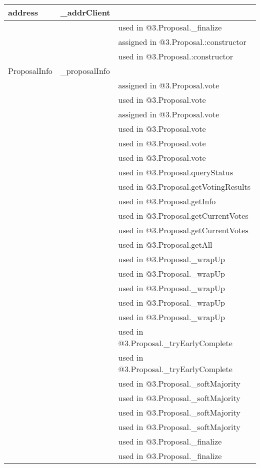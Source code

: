 \ifsoltables
\noindent\begin{tabular}{|l|l|p{5cm}|}\hline
address & \_{}addrClient &  \\\hline
 & & used in @3.Proposal.\_{}finalize\\\hline
 & & assigned in @3.Proposal.:constructor\\\hline
 & & used in @3.Proposal.:constructor\\\hline
ProposalInfo & \_{}proposalInfo &  \\\hline
 & & assigned in @3.Proposal.vote\\\hline
 & & used in @3.Proposal.vote\\\hline
 & & assigned in @3.Proposal.vote\\\hline
 & & used in @3.Proposal.vote\\\hline
 & & used in @3.Proposal.vote\\\hline
 & & used in @3.Proposal.vote\\\hline
 & & used in @3.Proposal.queryStatus\\\hline
 & & used in @3.Proposal.getVotingResults\\\hline
 & & used in @3.Proposal.getInfo\\\hline
 & & used in @3.Proposal.getCurrentVotes\\\hline
 & & used in @3.Proposal.getCurrentVotes\\\hline
 & & used in @3.Proposal.getAll\\\hline
 & & used in @3.Proposal.\_{}wrapUp\\\hline
 & & used in @3.Proposal.\_{}wrapUp\\\hline
 & & used in @3.Proposal.\_{}wrapUp\\\hline
 & & used in @3.Proposal.\_{}wrapUp\\\hline
 & & used in @3.Proposal.\_{}wrapUp\\\hline
 & & used in @3.Proposal.\_{}tryEarlyComplete\\\hline
 & & used in @3.Proposal.\_{}tryEarlyComplete\\\hline
 & & used in @3.Proposal.\_{}softMajority\\\hline
 & & used in @3.Proposal.\_{}softMajority\\\hline
 & & used in @3.Proposal.\_{}softMajority\\\hline
 & & used in @3.Proposal.\_{}softMajority\\\hline
 & & used in @3.Proposal.\_{}finalize\\\hline
 & & used in @3.Proposal.\_{}finalize\\\hline

\end{tabular}
